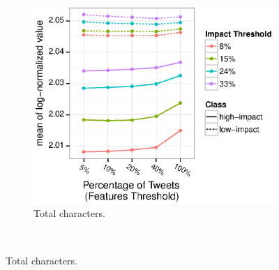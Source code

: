 \documentclass[10pt,letterpaper]{article}
\begin{document}
\begin{figure}[h]
\begin{subfigure}[h]{0.45\textwidth}
    \includegraphics[width=\textwidth]{figures_SI/Plots_from_data/total_characters.eps}
    \caption{Total characters.} \label{fig:feat_characters}
  \end{subfigure} ~ %


\end{figure}
\end{document}
